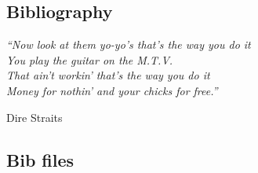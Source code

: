 \begin{refsection}

\chapter{Bibliography} \label{chapter:biblio}
\pagestyle{chapter}
 
\setlength{\epigraphwidth}{3in} 
\epigraph{\textit{``Now look at them yo-yo's that's the way you do it \\
                    You play the guitar on the M.T.V. \\
                    That ain't workin' that's the way you do it \\
                    Money for nothin' and your chicks for free.''}}{Dire Straits} 
\vspace{3em} 

\section{Bib files}

\clearpage
\pagestyle{biblio}
\printbibliography 

\end{refsection}